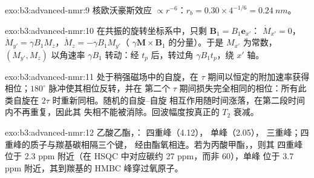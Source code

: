 \begin{solution}{exo:b3:advanced-nmr:9}
核欧沃豪斯效应 $\propto r^{-6}$：$r_b = 0.30 \times 4^{-1/6} = \qty{0.24}{nm}$。
\end{solution}

\begin{solution}{exo:b3:advanced-nmr:10}
在共振的旋转坐标系中，只剩 $\mathbf B_1 = B_1\mathbf e_{x'}$：
$\dot M_{x'} = 0$，$\dot M_{y'} = \gamma B_1M_z$，$\dot M_z = -\gamma B_1M_{y'}$（
$\gamma\mathbf M\times\mathbf B_1$ 的分量）。于是 $M_{x'}$ 为常数，$(M_{y'}, M_z)$ 以角速率
$\gamma B_1$ 转动：经 $t_p$ 后，转过角 $\gamma B_1t_p$，绕 $x'$ 轴。
\end{solution}

\begin{solution}{exo:b3:advanced-nmr:11}
处于稍强磁场中的自旋，在
$\tau$ 期间以恒定的附加速率获得相位；$180^\circ$ 脉冲使其相位反转，并在
第二个 $\tau$ 期间损失完全相同的相位：所有此类自旋在 $2\tau$ 时重新同相。随机的自旋–自旋
相互作用随时间涨落，在第二段时间内不再重复，因此其
失相不能被消除。回波幅度按真正的 $T_2$ 衰减。
\end{solution}

\begin{solution}{exo:b3:advanced-nmr:12}
乙酸乙酯，： 四重峰（4.12）， 单峰（2.05），
 三重峰；四重峰的质子与羰基碳相隔三个键，
经由酯氧相连。若为丙酸甲酯，，则其
四重峰位于 2.3 ppm 附近（在 HSQC 中对应碳约 27 ppm，而非 60），单峰
 位于 3.7 ppm 附近，其到羰基的 HMBC 峰穿过氧原子。
\end{solution}

